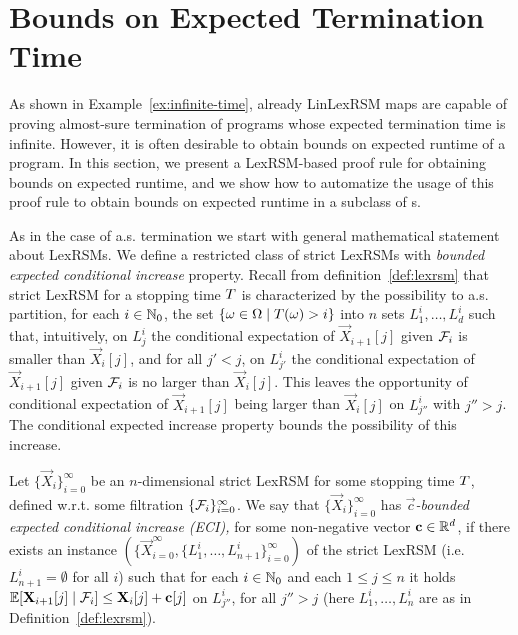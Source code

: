 \section{Bounds on Expected Termination Time}

As shown in Example~\ref{ex:infinite-time}, already LinLexRSM maps are capable 
of proving almost-sure termination of programs whose expected termination time 
is infinite. However, it is often desirable to obtain bounds on expected 
runtime of a program. In this section, we present a LexRSM-based proof rule for 
obtaining bounds on expected runtime, and we show how to automatize the usage 
of this proof rule to obtain bounds on expected runtime in a 
subclass of \PP{}s.

As in the case of a.s. termination we start with general mathematical statement 
about LexRSMs. We define a restricted class of strict LexRSMs with \emph{bounded 
expected conditional increase} property. Recall from 
definition~\ref{def:lexrsm} that strict
LexRSM for a stopping time $T$ is characterized by the possibility to 
a.s. partition, for each $i\in \mathbb{N}_0$, the set $\{\omega\in \Omega\mid 
T(\omega)>i \}$ into $n$ sets $L^i_1,\dots,L^i_d$ such that, intuitively, 
on $L^i_j$ the conditional expectation of $\vec{X}_{i+1}[j]$ given $\mathcal{F}_i$ 
is smaller than $\vec{X}_i[j]$, and for all $j'<j$, on $L^i_{j'}$ the 
conditional expectation of $\vec{X}_{i+1}[j]$ given $\mathcal{F}_i$ 
is no larger than $\vec{X}_i[j]$. This leaves the opportunity of conditional 
expectation of $\vec{X}_{i+1}[j]$ being larger than $\vec{X}_i[j]$ on 
$L^i_{j''}$ with $j''>j$. The conditional expected increase property bounds the 
possibility of this increase.

\begin{definition}
	\label{def:lexrsm-eci}
Let $\{\vec{X}_{i}\}_{i=0}^{\infty}$ be an 
$n$-dimensional strict LexRSM for some stopping time $T$, defined w.r.t. some 
filtration $\{\mathcal{F}_i\}_{i=0}^{\infty}$. We say that 
$\{\vec{X}_{i}\}_{i=0}^{\infty}$ has \emph{$\vec{c}$-bounded expected 
conditional 
increase (ECI),} for 
some non-negative vector $\mathbf{c}\in\mathbb{R}^d$, if there exists an instance $(\{\vec{X}_{i=0}^{\infty},\{L_1^i,\dots,L_{n+1}^i\}_{i=0}^{\infty})$ of the strict LexRSM (i.e. $L^i_{n+1}=\emptyset$ for all $i$) such that for each $i\in \mathbb{N}_0 $ and 
each $1\leq 
j \leq n $ it holds 
$\mathbb{E}[\mathbf{X}_{i+1}[j]\mid \mathcal{F}_i]\leq \mathbf{X}_{i}[j]+\mathbf{c}[j]$ on 
$L^i_{j''}$, 
for all $j''>j$ 
(here $L^i_1,\dots,L^i_n$ are as in Definition~\ref{def:lexrsm}).
\end{definition}

